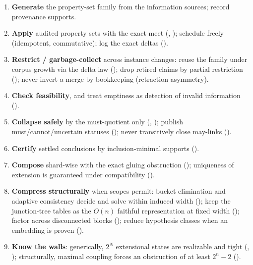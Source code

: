 \documentclass[11pt]{article}
\begin{document}
\begin{enumerate}
\item \textbf{Generate} the property-set family from the information
  sources; record provenance supports.
\item \textbf{Apply} audited property sets with the exact meet
  (, ); schedule freely
  (idempotent, commutative); log the exact deltas
  ().
\item \textbf{Restrict / garbage-collect} across instance changes:
  reuse the family under corpus growth via the delta law
  (); drop retired claims by partial
  restriction (); never invert a
  merge by bookkeeping (retraction asymmetry).
\item \textbf{Check feasibility}, and treat emptiness as detection of
  invalid information
  ().
\item \textbf{Collapse safely} by the must-quotient only
  (, ); publish
  must/cannot/uncertain statuses (); never
  transitively close may-links ().
\item \textbf{Certify} settled conclusions by inclusion-minimal
  supports ().
\item \textbf{Compose} shard-wise with the exact gluing obstruction
  (); uniqueness of extension is
  guaranteed under compatibility
  ().
\item \textbf{Compress structurally} when scopes permit: bucket
  elimination and adaptive consistency decide and solve within induced
  width (); keep the
  junction-tree tables as the $O(n)$ faithful representation at fixed
  width (); factor across disconnected
  blocks (); reduce hypothesis
  classes when an embedding is proven
  ().
\item \textbf{Know the walls}: generically, $2^N$ extensional states
  are realizable and tight
  (,
  ); structurally, maximal
  coupling forces an obstruction of at least $2^n-2$
  ().
\end{enumerate}
\end{document}
